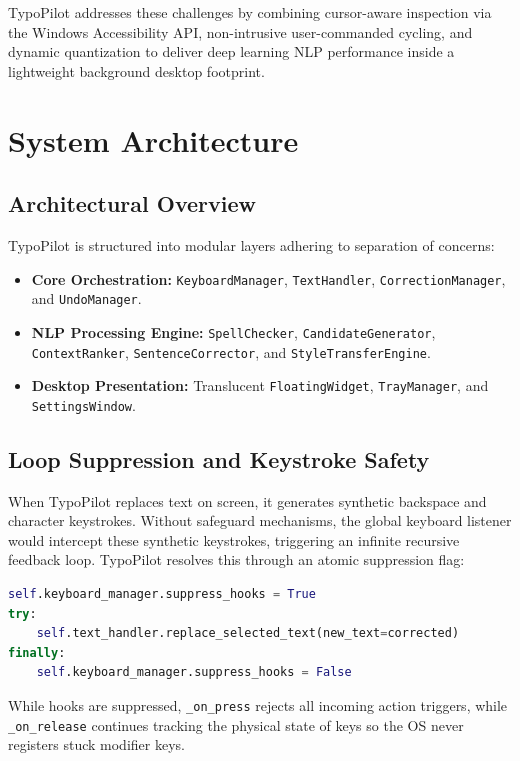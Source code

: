 \documentclass[11pt,a4paper]{article}
\begin{document}
TypoPilot addresses these challenges by combining cursor-aware inspection via the Windows Accessibility API, non-intrusive user-commanded cycling, and dynamic quantization to deliver deep learning NLP performance inside a lightweight background desktop footprint.

\section{System Architecture}

\subsection{Architectural Overview}
TypoPilot is structured into modular layers adhering to separation of concerns:
\begin{itemize}
    \item \textbf{Core Orchestration:} \texttt{KeyboardManager}, \texttt{TextHandler}, \texttt{CorrectionManager}, and \texttt{UndoManager}.
    \item \textbf{NLP Processing Engine:} \texttt{SpellChecker}, \texttt{CandidateGenerator}, \texttt{ContextRanker}, \texttt{SentenceCorrector}, and \texttt{StyleTransferEngine}.
    \item \textbf{Desktop Presentation:} Translucent \texttt{FloatingWidget}, \texttt{TrayManager}, and \texttt{SettingsWindow}.
\end{itemize}

\subsection{Loop Suppression and Keystroke Safety}
When TypoPilot replaces text on screen, it generates synthetic backspace and character keystrokes. Without safeguard mechanisms, the global keyboard listener would intercept these synthetic keystrokes, triggering an infinite recursive feedback loop. TypoPilot resolves this through an atomic suppression flag:
\begin{lstlisting}[language=Python]
self.keyboard_manager.suppress_hooks = True
try:
    self.text_handler.replace_selected_text(new_text=corrected)
finally:
    self.keyboard_manager.suppress_hooks = False
\end{lstlisting}
While hooks are suppressed, \texttt{\_on\_press} rejects all incoming action triggers, while \texttt{\_on\_release} continues tracking the physical state of keys so the OS never registers stuck modifier keys.
\end{document}
